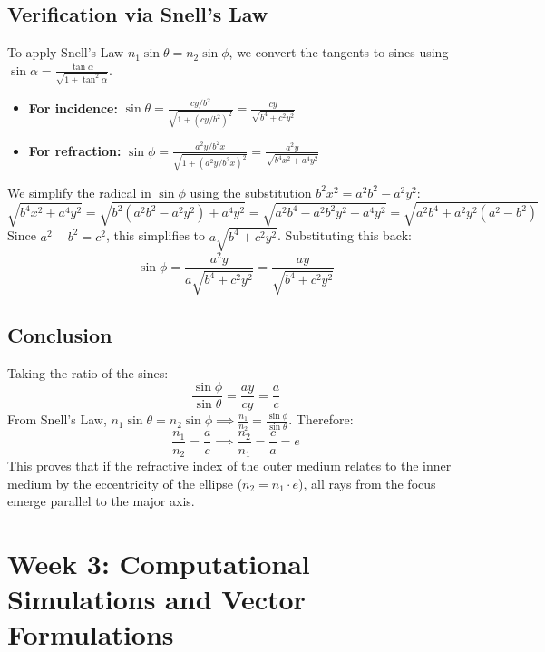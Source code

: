 \documentclass{article}
\begin{document}
\subsection{Verification via Snell's Law}
To apply Snell's Law $n_1 \sin \theta = n_2 \sin \phi$, we convert the tangents to sines using $\sin \alpha = \frac{\tan \alpha}{\sqrt{1+\tan^2 \alpha}}$.
\begin{itemize}
    \item \textbf{For incidence:} $\sin \theta = \frac{cy/b^2}{\sqrt{1 + (cy/b^2)^2}} = \frac{cy}{\sqrt{b^4 + c^2y^2}}$
    \item \textbf{For refraction:} $\sin \phi = \frac{a^2y/b^2x}{\sqrt{1 + (a^2y/b^2x)^2}} = \frac{a^2y}{\sqrt{b^4x^2 + a^4y^2}}$
\end{itemize}
We simplify the radical in $\sin \phi$ using the substitution $b^2x^2 = a^2b^2 - a^2y^2$:
\begin{equation}
    \sqrt{b^4x^2 + a^4y^2} = \sqrt{b^2(a^2b^2 - a^2y^2) + a^4y^2} = \sqrt{a^2b^4 - a^2b^2y^2 + a^4y^2} = \sqrt{a^2b^4 + a^2y^2(a^2-b^2)}
\end{equation}
Since $a^2 - b^2 = c^2$, this simplifies to $a\sqrt{b^4 + c^2y^2}$. Substituting this back:
\begin{equation}
    \sin \phi = \frac{a^2y}{a\sqrt{b^4 + c^2y^2}} = \frac{ay}{\sqrt{b^4 + c^2y^2}}
\end{equation}

\subsection{Conclusion}
Taking the ratio of the sines:
\begin{equation}
    \frac{\sin \phi}{\sin \theta} = \frac{ay}{cy} = \frac{a}{c}
\end{equation}
From Snell's Law, $n_1 \sin \theta = n_2 \sin \phi \implies \frac{n_1}{n_2} = \frac{\sin \phi}{\sin \theta}$. Therefore:
\begin{equation}
    \frac{n_1}{n_2} = \frac{a}{c} \implies \frac{n_2}{n_1} = \frac{c}{a} = e
\end{equation}
This proves that if the refractive index of the outer medium relates to the inner medium by the eccentricity of the ellipse ($n_2 = n_1 \cdot e$), all rays from the focus emerge parallel to the major axis.

\section{Week 3: Computational Simulations and Vector Formulations}
\end{document}
